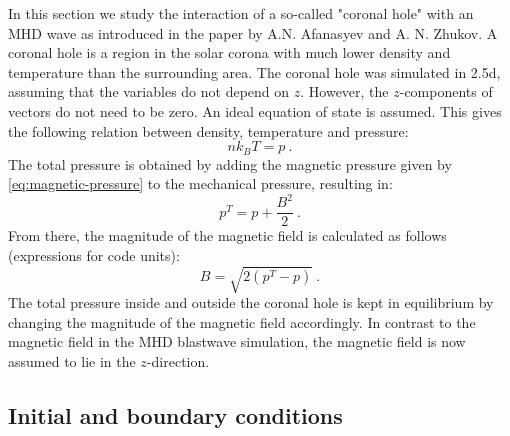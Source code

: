 In this section we study the interaction of a so-called "coronal hole" with an MHD wave as introduced in the paper \cite{coronal-hole} by A.N. Afanasyev and A. N. Zhukov. 
A coronal hole is a region in the solar corona with much lower density and temperature than the surrounding area.
The coronal hole was simulated in 2.5d, assuming that the variables do not depend on $z$. However, the $z$-components of vectors do not need to be zero.
An ideal equation of state is assumed. This gives the following relation between density, temperature and pressure:
\begin{equation}
	nk_BT = p \ .
	\label{eq:ideal-gas}
\end{equation}
The total pressure is obtained by adding the magnetic pressure given by \cref{eq:magnetic-pressure} to the mechanical pressure, resulting in:
\begin{equation*}
	p^T = p + \frac{B^2}{2} \ .
\end{equation*}
From there, the magnitude of the magnetic field is calculated as follows (expressions for code units):
\begin{equation}
	B = \sqrt{2 \left( p^T-p \right) } \ .
	\label{eq:magnetic-magnitude}
\end{equation}
The total pressure inside and outside the coronal hole is kept in equilibrium by changing the magnitude of the magnetic field accordingly.
In contrast to the magnetic field in the MHD blastwave simulation, the magnetic field is now assumed to lie in the $z$-direction.

\subsection{Initial and boundary conditions}

